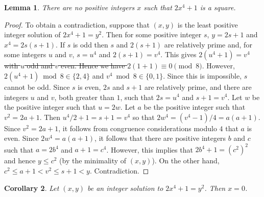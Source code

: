 \documentclass{article}
\newtheorem{lemma}{Lemma}
\numberwithin{lemma}{section}
\newtheorem{corollary}[lemma]{Corollary}
\newcommand{\changed}[1]{{\color{teal} #1}}
\begin{document}
\begin{lemma}\label{lem2}
There are no positive integers $x$ such that $2x^4+1$ is a square.
\end{lemma}
\begin{proof}
To obtain a contradiction, suppose that $(x, y)$ is the least positive integer
solution of $2x^4+1 = y^2$. Then for some positive integer $s$, $y = 2s+1$ and $x^4 = 2s(s+1)$. If $s$ is odd then $s$ and $2(s+1)$ are relatively prime and, for some
integers $u$ and $v$, $s = u^4$ and $2(s+1) = v^4$. This gives $2(u^4+1) = v^4$ \sout{with $u$ odd
and $v$ even. Hence we have $2(1+1) \equiv 0 \pmod 8$}. \changed{However, $2(u^4+1) \bmod 8 \in \{2, 4\}$ and $v^4 \bmod 8 \in \{0, 1\}$.} Since this is impossible, $s$ cannot
be odd. Since $s$ is even, $2s$ and $s+1$ are relatively prime, and there are integers $u$
and $v$, both greater than $1$, such that $2s = u^4$ and $s+1 = v^4$. Let $w$ be the positive
integer such that $u = 2w$. Let $a$ be the positive integer such that $v^2 = 2a+1$. Then
$u^4/2+1 = s+1 = v^4$ so that $2w^4 = (v^4-1)/4 = a(a+1)$. Since $v^2 = 2a+1$,
it follows from congruence considerations modulo $4$ that $a$ is even. Since $2w^4 = a(a+1)$,
it follows that there are positive integers $b$ and $c$ such that $a = 2b^4$ and
$a+1 = c^4$. However, this implies that $2b^4+1 = (c^2)^2$ and hence $y \le c^2$ (by the
minimality of $(x, y)$). On the other hand, $c^2 \le a+1 < v^2 \le s+1 < y$. Contradiction.
\end{proof}

\changed{
\begin{corollary}\label{cor2}
Let $(x, y)$ be an integer solution to $2x^4+1 = y^2$. Then $x = 0$.
\end{corollary}
}
\end{document}
